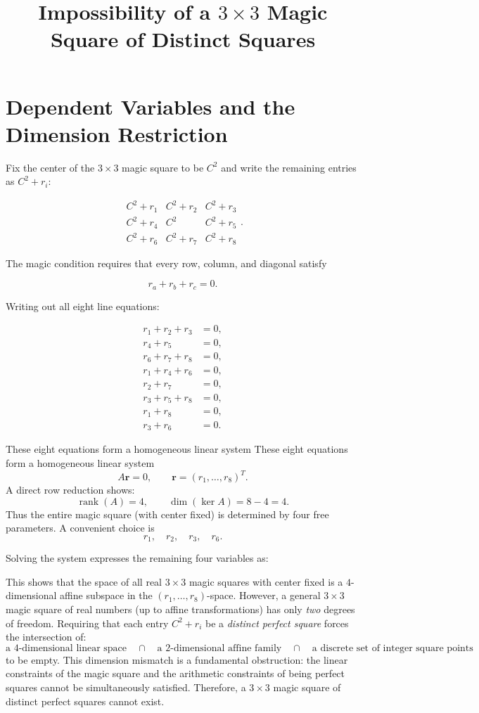 \documentclass[12pt]{article}
\title{Impossibility of a $3\times 3$ Magic Square of Distinct Squares}
\author{}
\date{}
\begin{document}
\maketitle
\section*{Dependent Variables and the Dimension Restriction}

Fix the center of the $3\times 3$ magic square to be $C^2$ and write the
remaining entries as $C^2 + r_i$:


\[
\begin{matrix}
C^2+r_1 & C^2+r_2 & C^2+r_3 \\
C^2+r_4 & C^2     & C^2+r_5 \\
C^2+r_6 & C^2+r_7 & C^2+r_8
\end{matrix}.
\]



The magic condition requires that every row, column, and diagonal satisfy


\[
r_a + r_b + r_c = 0.
\]



Writing out all eight line equations:


\[
\begin{aligned}
r_1+r_2+r_3 &= 0,\\
r_4+r_5 &= 0,\\
r_6+r_7+r_8 &= 0,\\
r_1+r_4+r_6 &= 0,\\
r_2+r_7 &= 0,\\
r_3+r_5+r_8 &= 0,\\
r_1+r_8 &= 0,\\
r_3+r_6 &= 0.
\end{aligned}
\]



These eight equations form a homogeneous linear system
These eight equations form a homogeneous linear system \[ A\mathbf{r} = 0,\qquad \mathbf{r}=(r_1,\dots,r_8)^T. \] A direct row reduction shows: \[ \operatorname{rank}(A)=4, \qquad \dim(\ker A)=8-4=4. \] Thus the entire magic square (with center fixed) is determined by four free parameters. A convenient choice is \[ r_1,\quad r_2,\quad r_3,\quad r_6. \]


Solving the system expresses the remaining four variables as:





This shows that the space of all real $3\times 3$ magic squares with center fixed is a $4$-dimensional affine subspace in the $(r_1,\dots,r_8)$-space. However, a general $3\times 3$ magic square of real numbers (up to affine transformations) has only \emph{two} degrees of freedom. Requiring that each entry $C^2+r_i$ be a \emph{distinct perfect square} forces the intersection of: \[ \text{a $4$-dimensional linear space} \quad\cap\quad \text{a $2$-dimensional affine family} \quad\cap\quad \text{a discrete set of integer square points} \] to be empty. This dimension mismatch is a fundamental obstruction: the linear constraints of the magic square and the arithmetic constraints of being perfect squares cannot be simultaneously satisfied. Therefore, a $3\times 3$ magic square of distinct perfect squares cannot exist.
\end{document}
